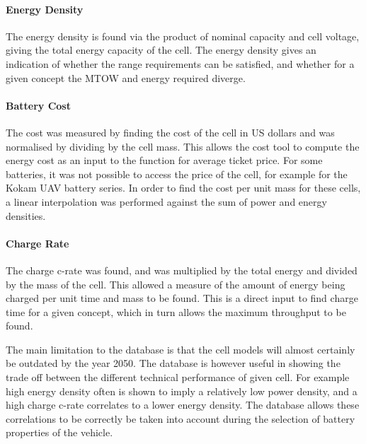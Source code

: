  \paragraph{Energy Density}  The energy density is found via the product of nominal capacity and cell voltage, giving the total energy capacity of the cell. The energy density gives an indication of whether the range requirements can be satisfied, and whether for a given concept the MTOW and energy required diverge.
 \paragraph{Battery Cost} The cost was measured by finding the cost of the cell in US dollars and was normalised by dividing by the cell mass. This allows the cost tool to compute the energy cost as an input to the function for average ticket price. For some batteries, it was not possible to access the price of the cell, for example for the Kokam UAV battery series. In order to find the cost per unit mass for these cells, a linear interpolation was performed against the sum of power and energy densities. 
 \paragraph{Charge Rate} The charge c-rate was found, and was multiplied by the total energy and divided by the mass of the cell. This allowed a measure of the amount of energy being charged per unit time and mass to be found. This is a direct input to find charge time for a given concept, which in turn allows the maximum throughput to be found.  

 The main limitation to the database is that the cell models will almost certainly be outdated by the year 2050. The database is however useful in showing the trade off between the different technical performance of given cell. For example high energy density often is shown to imply a relatively low power density, and a high charge c-rate correlates to a lower energy density. The database allows these correlations to be correctly be taken into account during the selection of battery properties of the vehicle. 
 


 
